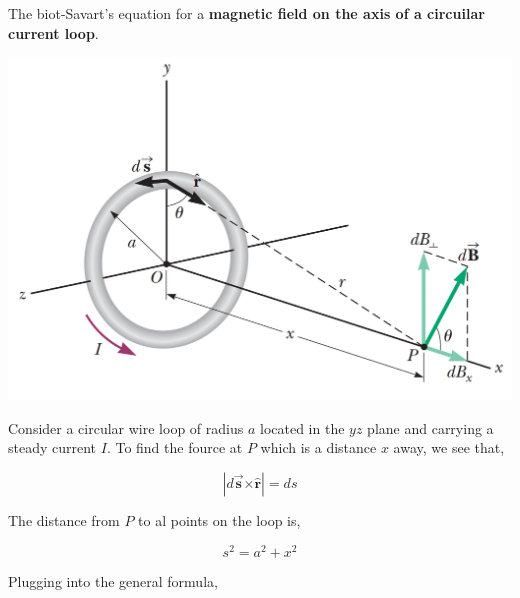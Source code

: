 \documentclass[12pt, titlepage, oneside]{article}
\let\oldhat\hat
\let\oldvec\vec
\newcommand{\cross}{\bm{\times}}
\renewcommand{\hat}[1]{\oldhat{\mathbf{#1}}}
\renewcommand{\vec}[1]{\oldvec{\bm{#1}}}
\renewcommand{\hat}[1]{\oldhat{\bm{#1}}}
\renewcommand{\b}[1]{\textbf{#1}}
\begin{document}
\newpage
The biot-Savart's equation for a \b{magnetic field on the axis of a circuilar current loop}.
\begin{center}
\includegraphics[scale=0.4]{4.png}
\end{center}

Consider a circular wire loop of radius $a$ located in the $yz$ plane and carrying a steady current $I$. To find the fource at $P$ which is a distance $x$ away, we see that,

\begin{equation}
|d\vec{s} \cross \hat{r}| = ds
\end{equation}

The distance from $P$ to al points on the loop is,

\begin{equation}
s^2 = a^2 + x^2
\end{equation}

Plugging into the general formula,
\end{document}
